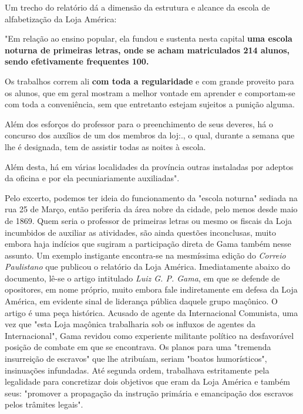 Um trecho do relatório dá a dimensão da estrutura e alcance da escola de
alfabetização da Loja América:

"Em relação ao ensino popular, ela fundou e sustenta nesta capital
\textbf{uma escola noturna de primeiras letras, onde se acham
matriculados 214 alunos, sendo efetivamente frequentes 100.}

Os trabalhos correm ali \textbf{com toda a regularidade} e com grande
proveito para os alunos, que em geral mostram a melhor vontade em
aprender e comportam-se com toda a conveniência, sem que entretanto
estejam sujeitos a punição alguma.

Além dos esforços do professor para o preenchimento de seus deveres, há
o concurso dos auxílios de um dos membros da loj:., o qual, durante a
semana que lhe é designada, tem de assistir todas as noites à escola.

Além desta, há em várias localidades da província outras instaladas por
adeptos da oficina e por ela pecuniariamente auxiliadas".

Pelo excerto, podemos ter ideia do funcionamento da "escola noturna"
sediada na rua 25 de Março, então periferia da área nobre da cidade,
pelo menos desde maio de 1869. Quem seria o professor de primeiras
letras ou mesmo os fiscais da Loja incumbidos de auxiliar as atividades,
são ainda questões inconclusas, muito embora haja indícios que sugiram a
participação direta de Gama também nesse assunto. Um exemplo instigante
encontra-se na mesmíssima edição do \emph{Correio Paulistano} que
publicou o relatório da Loja América. Imediatamente abaixo do documento,
lê-se o artigo intitulado \emph{Luiz G. P. Gama}, em que se defende de
opositores, em nome próprio, muito embora fale indiretamente em defesa
da Loja América, em evidente sinal de liderança pública daquele grupo
maçônico. O artigo é uma peça histórica. Acusado de agente da
Internacional Comunista, uma vez que "esta Loja maçônica
trabalharia sob os influxos de agentes da Internacional", Gama
revidou como experiente militante político na desfavorável posição de
combate em que se encontrava. Os planos para uma "tremenda insurreição
de escravos" que lhe atribuíam, seriam "boatos humorísticos",
insinuações infundadas. Até segunda ordem, trabalhava estritamente pela
legalidade para concretizar dois objetivos que eram da Loja América e
também seus: "promover a propagação da instrução primária e emancipação
dos escravos pelos trâmites legais".

